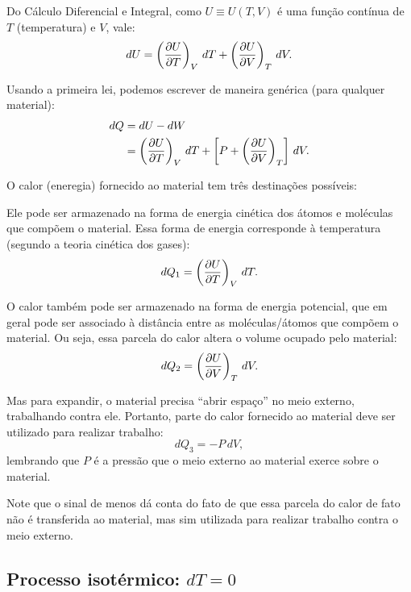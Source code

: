 \documentclass[a4paper,12pt]{scrartcl}
\begin{document}
  Do Cálculo Diferencial e Integral, como $U \equiv U(T,V)$ é uma função contínua de $T$ (temperatura) e $V$, vale:
  \begin{equation*}
  dU = \left(\frac{\partial U}{\partial T}\right)_{V}\, dT + \left(\frac{\partial U}{\partial V}\right)_{T}\, dV.
  \end{equation*}
  
  Usando a primeira lei, podemos escrever de maneira genérica (para qualquer material):
  \begin{align}
  dQ &= dU - dW \nonumber\\
     &= \left(\frac{\partial U}{\partial T}\right)_{V}\, dT+ \left[P + \left(\frac{\partial U}{\partial V}\right)_{T}\right]\, dV.\label{eq:dQ}
  \end{align}

  O calor (eneregia) fornecido ao material tem três destinações possíveis:
  \begin{compactenum}
  \item Ele pode ser armazenado na forma de energia cinética dos átomos e moléculas que compõem o material.
  Essa forma de energia corresponde à temperatura (segundo a teoria cinética dos gases):
  \begin{equation*}
  dQ_1 = \left(\frac{\partial U}{\partial T}\right)_{V}\, dT.
  \end{equation*}

  \item O calor também pode ser armazenado na forma de energia potencial, que em geral pode ser associado à distância entre as moléculas/átomos que compõem o material. Ou seja, essa parcela do calor altera o volume ocupado pelo material:
  \begin{equation*}
  dQ_2 = \left(\frac{\partial U}{\partial V}\right)_{T}\, dV.
  \end{equation*}
  
  \item Mas para expandir, o material precisa ``abrir espaço'' no meio externo, trabalhando contra ele. Portanto, parte do calor fornecido ao material deve ser utilizado para realizar trabalho:
  \begin{equation*}
  dQ_3 = -P\, dV,
  \end{equation*}
  lembrando que $P$ é a pressão que o meio externo ao material exerce sobre o material.
  
  Note que o sinal de menos dá conta do fato de que essa parcela do calor de fato não é transferida ao material, mas sim utilizada para realizar trabalho contra o meio externo.
  \end{compactenum}

  \subsection{Processo isotérmico: $dT = 0$}
    
\end{document}
